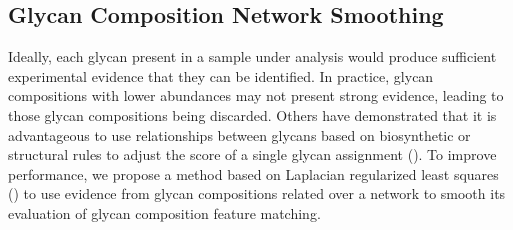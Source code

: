 \subsection{Glycan Composition Network Smoothing}

    Ideally, each glycan present in a sample under analysis would produce sufficient
    experimental evidence that they can be identified. In practice, glycan
    compositions with lower abundances may not present strong evidence, leading
    to those glycan compositions being discarded. Others have demonstrated that
    it is advantageous to use relationships between glycans based on biosynthetic
    or structural rules to adjust the score of a single glycan assignment
    (\cite{Goldberg2009, Kronewitter2014}). To improve performance, we propose
    a method based on Laplacian regularized least squares (\cite{Belkin2006})
    to use evidence from glycan compositions related over a network to smooth
    its evaluation of glycan composition feature matching.

    

    

    

